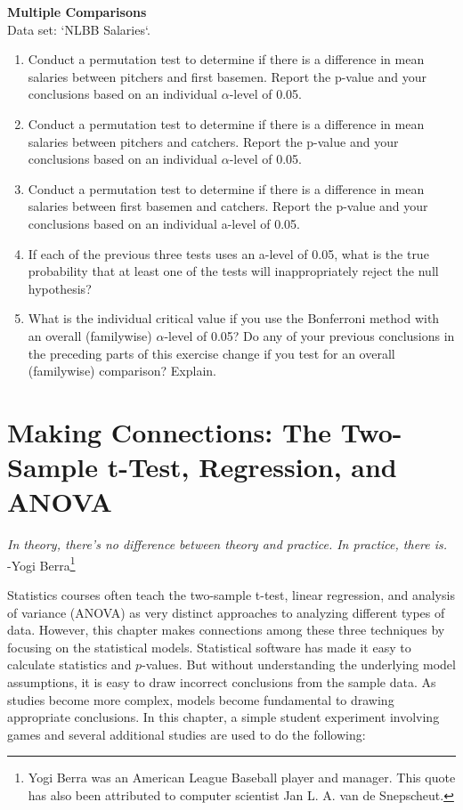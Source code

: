 \documentclass[
]{report}
\begin{document}
\begin{list}{E.}{ \setlength{\itemsep}{0.5em}}
  
  \item \textbf{Multiple Comparisons} \\
  Data set: `NLBB Salaries`. 
  \begin{enumerate}
    \setcounter{enumi}{0}  
    \item Conduct a permutation test to determine if there is a difference in mean salaries between
pitchers and first basemen. Report the p-value and your conclusions based on an individual
$\alpha$-level of 0.05.
    \item Conduct a permutation test to determine if there is a difference in mean salaries between
pitchers and catchers. Report the p-value and your conclusions based on an individual
$\alpha$-level of 0.05.
    \item Conduct a permutation test to determine if there is a difference in mean salaries between first
basemen and catchers. Report the p-value and your conclusions based on an individual a-level
of 0.05.
    \item If each of the previous three tests uses an a-level of 0.05, what is the true probability that at least
one of the tests will inappropriately reject the null hypothesis?
    \item What is the individual critical value if you use the Bonferroni method with an overall (familywise)
$\alpha$-level of 0.05? Do any of your previous conclusions in the preceding parts of this exercise
change if you test for an overall (familywise) comparison? Explain.
  \end{enumerate}
  
  
  
  
\end{list}

\chapter{Making Connections: The Two-Sample t-Test, Regression, and ANOVA}\label{making-connections-the-two-sample-t-test-regression-and-anova}

{ \emph{In theory, there's no difference between theory and practice. In practice, there is.}}\\
{ -Yogi Berra\footnote{Yogi Berra was an American League Baseball player and manager. This quote has also been attributed to computer scientist Jan L. A. van de Snepscheut.}
}

Statistics courses often teach the two-sample t-test, linear regression, and analysis of variance (ANOVA) as very distinct approaches to analyzing different types of data. However, this chapter makes connections among these three techniques by focusing on the statistical models. Statistical software has made it easy to calculate statistics and \(p\)-values. But without understanding the underlying model assumptions, it is easy to draw incorrect conclusions from the sample data. As studies become more complex, models become fundamental to drawing appropriate conclusions. In this chapter, a simple student experiment involving games and several additional studies are used to do the following:
\end{document}
